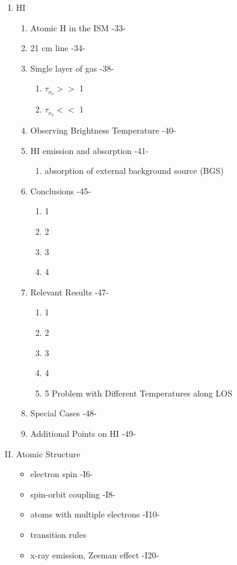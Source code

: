 \documentclass{article}
\begin{document}
\begin{enumerate}[I.]
\item HI
\begin{enumerate}
  \item Atomic H in the ISM -33-
  \item 21 cm line -34-
  \item Single layer of gas -38-
  \begin{enumerate}
    \item $\tau_{\nu_o}  >>$ 1
    \item $\tau_{\nu_o} <<$ 1
  \end{enumerate}
  \item Observing Brightness Temperature -40-
  \item HI emission and absorption -41-
  \begin{enumerate}
    \item absorption of external background source (BGS)
  \end{enumerate}
  \item Conclusions -45-
  \begin{enumerate}
    \item 1
    \item 2
    \item 3
    \item 4
  \end{enumerate}
  \item Relevant Results -47-
  \begin{enumerate}
    \item 1
    \item 2
    \item 3
    \item 4
    \item 5 Problem with Different Temperatures along LOS
  \end{enumerate}
  \item Special Cases -48-
  \item Additional Points on HI -49-
\end{enumerate}

\item Atomic Structure
\begin{itemize}
  \item electron spin -I6-
  \item spin-orbit coupling -I8-
  \item atoms with multiple electrons -I10-
  \item transition rules
  \item x-ray emission, Zeeman effect -I20-
\end{itemize}


\end{enumerate}
\end{document}
